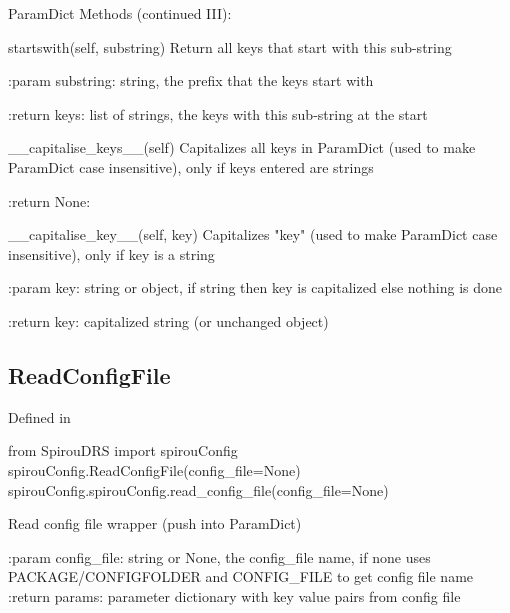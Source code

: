 \noindent\begin{minipage}{\textwidth}
\begin{pythondocstring}
ParamDict Methods (continued III):

	startswith(self, substring)
	        Return all keys that start with this sub-string

	        :param substring: string, the prefix that the keys start with

	        :return keys: list of strings, the keys with this sub-string at the start

	__capitalise_keys__(self)
	        Capitalizes all keys in ParamDict (used to make ParamDict case
	        insensitive), only if keys entered are strings

	        :return None:

	__capitalise_key__(self, key)
        Capitalizes "key" (used to make ParamDict case insensitive), only if
        key is a string

        :param key: string or object, if string then key is capitalized else
                    nothing is done

        :return key: capitalized string (or unchanged object)

\end{pythondocstring}
\end{minipage}

\noindent\begin{minipage}{\textwidth}
\subsection{ReadConfigFile}

Defined in \spirouConfig{}

\begin{pythonbox}
from SpirouDRS import spirouConfig
spirouConfig.ReadConfigFile(config_file=None)
spirouConfig.spirouConfig.read_config_file(config_file=None)
\end{pythonbox}

\begin{pythondocstring}
Read config file wrapper (push into ParamDict)

:param config_file: string or None, the config_file name, if none uses
                    PACKAGE/CONFIGFOLDER and CONFIG_FILE to get config
                    file name
:return params: parameter dictionary with key value pairs from config file
\end{pythondocstring}
\end{minipage}


